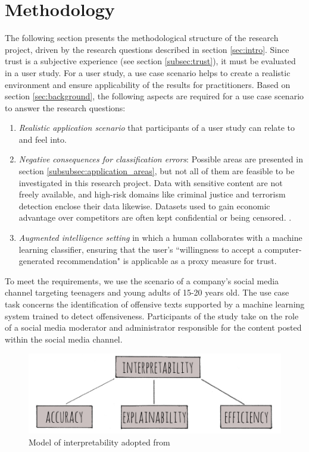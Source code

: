 \section{Methodology}
\label{sec:method}
The following section presents the methodological structure of the research project, driven by the research questions described in section \ref{sec:intro}.\newline
Since trust is a subjective experience (see section \ref{subsec:trust}), it must be evaluated in a user study. For a user study, a use case scenario helps to create a realistic environment and ensure applicability of the results for practitioners. Based on section \ref{sec:background}, the following aspects are required for a use case scenario to answer the research questions:
\begin{enumerate}
	\item \textit{Realistic application scenario} that participants of a user study can relate to and feel into.
	\item \textit{Negative consequences for classification errors}: Possible areas are presented in section \ref{subsubsec:application_areas}, but not all of them are feasible to be investigated in this research project. Data with sensitive content are not freely available, and high-risk domains like criminal justice and terrorism detection enclose their data likewise. Datasets used to gain economic advantage over competitors are often kept confidential or being censored. \cite{diakopoulos2016accountability}.
	\item \textit{Augmented intelligence setting} in which a human collaborates with a machine learning classifier, ensuring that the user's ``willingness to accept a computer-generated recommendation" \cite{vorm2018assessing} is applicable as a proxy measure for trust.
\end{enumerate}
To meet the requirements, we use the scenario of a company's social media channel targeting teenagers and young adults of 15-20 years old. The use case task concerns the identification of offensive texts supported by a machine learning system trained to detect offensiveness. Participants of the study take on the role of a social media moderator and administrator responsible for the content posted within the social media channel. 
\begin{figure} [H]
	\centering
	\includegraphics[width=0.7\linewidth]{img/model2}
	\caption{Model of interpretability adopted from \cite{ruping2006learning}}
	\label{fig:model_interpretability}
\end{figure}
